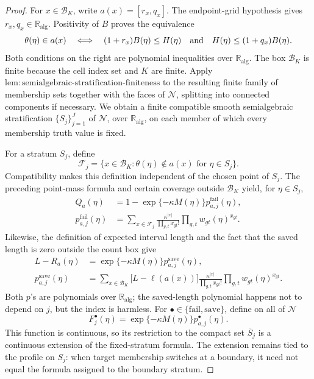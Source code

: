 \documentclass{article}
\begin{document}
\begin{proof}
For \(x\in\mathcal B_K\), write \(a(x)=[r_x,q_x]\).  The endpoint-grid hypothesis gives \(r_x,q_x\in\mathbb R_{\mathrm{alg}}\).  Positivity of \(B\) proves the equivalence
\[
 \theta(\eta)\in a(x)
 \quad\Longleftrightarrow\quad
 (1+r_x)B(\eta)\le H(\eta)
 \quad\hbox{and}\quad
 H(\eta)\le(1+q_x)B(\eta).
\]
Both conditions on the right are polynomial inequalities over \(\mathbb R_{\mathrm{alg}}\).  The box \(\mathcal B_K\) is finite because the cell index set and \(K\) are finite.  Apply \(\mathrm{lem{:}semialgebraic\text{-}stratification\text{-}finiteness}\) to the resulting finite family of membership sets together with the faces of \(\mathcal N\), splitting into connected components if necessary.  We obtain a finite compatible smooth semialgebraic stratification \(\{S_j\}_{j=1}^J\) of \(\mathcal N\), over \(\mathbb R_{\mathrm{alg}}\), on each member of which every membership truth value is fixed.

For a stratum \(S_j\), define
\[
 \mathcal F_j=\{x\in\mathcal B_K:
       \theta(\eta)\notin a(x)\text{ for }\eta\in S_j\}.
\]
Compatibility makes this definition independent of the chosen point of \(S_j\).  The preceding point-mass formula and certain coverage outside \(\mathcal B_K\) yield, for \(\eta\in S_j\),
\[
\begin{aligned}
Q_a(\eta)
 &=1-\exp\{-\kappa M(\eta)\}p^{\mathrm{fail}}_{a,j}(\eta),\\
p^{\mathrm{fail}}_{a,j}(\eta)
 &=\sum_{x\in\mathcal F_j}
   \frac{\kappa^{|x|}}{\prod_{g,t}x_{gt}!}
   \prod_{g,t}w_{gt}(\eta)^{x_{gt}}.
\end{aligned}
\]
Likewise, the definition of expected interval length and the fact that the saved length is zero outside the count box give
\[
\begin{aligned}
L-R_a(\eta)
 &=\exp\{-\kappa M(\eta)\}p^{\mathrm{save}}_{a,j}(\eta),\\
p^{\mathrm{save}}_{a,j}(\eta)
 &=\sum_{x\in\mathcal B_K}
   \bigl[L-\ell(a(x))\bigr]
   \frac{\kappa^{|x|}}{\prod_{g,t}x_{gt}!}
   \prod_{g,t}w_{gt}(\eta)^{x_{gt}}.
\end{aligned}
\]
Both \(p\)'s are polynomials over \(\mathbb R_{\mathrm{alg}}\); the saved-length polynomial happens not to depend on \(j\), but the index is harmless.  For \(\bullet\in\{\mathrm{fail},\mathrm{save}\}\), define on all of \(\mathcal N\)
\[
 F_j^{\bullet}(\eta)
 =\exp\{-\kappa M(\eta)\}p^{\bullet}_{a,j}(\eta).
\]
This function is continuous, so its restriction to the compact set \(\overline S_j\) is a continuous extension of the fixed-stratum formula.  The extension remains tied to the profile on \(S_j\): when target membership switches at a boundary, it need not equal the formula assigned to the boundary stratum.


\end{proof}
\end{document}
